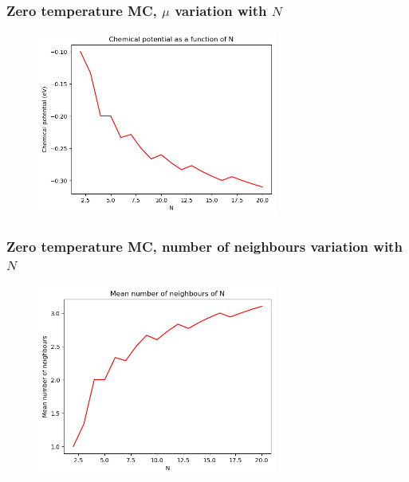 \documentclass{beamer}
\begin{document}
\begin{frame}
    \frametitle{Zero temperature MC, $\mu$ variation with $N$}

    \begin{figure}
        \includegraphics[width=0.7\textwidth]{images/mub.png}
    \end{figure}

\end{frame}

\begin{frame}
    \frametitle{Zero temperature MC, number of neighbours variation with $N$}

    \begin{figure}
        \includegraphics[width=0.7\textwidth]{images/nbrsb.png}
    \end{figure}

\end{frame}
\end{document}
